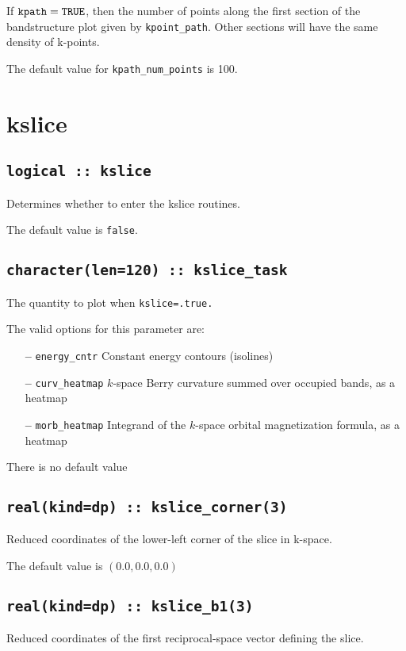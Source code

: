 If $\verb#kpath#=\verb#TRUE#$, then the number of points along
the first section of the bandstructure plot given by
\verb#kpoint_path#. Other sections will have the same density of
k-points. 

The default value for \verb#kpath_num_points# is 100.




\clearpage
\section{kslice}

\subsection[berry]{\tt logical :: kslice}
Determines whether to enter the kslice routines.

The default value is \verb#false#.

\subsection[kslice\_task]{\tt character(len=120) ::  kslice\_task}
The quantity to plot when {\tt kslice=.true.} 

The valid options for this parameter are:
\begin{itemize}
\item[{\bf --}]  \verb#energy_cntr# Constant energy contours (isolines)
\item[{\bf --}] \verb#curv_heatmap# $k$-space Berry curvature summed over
  occupied bands, as a heatmap
\item[{\bf --}] \verb#morb_heatmap# Integrand of the $k$-space orbital
  magnetization formula, as a heatmap
\end{itemize}
There is no default value

\subsection[kslice\_corner]{\tt real(kind=dp) :: kslice\_corner(3)}
Reduced coordinates of the lower-left corner of the slice in k-space.

The default value is $(0.0,0.0,0.0)$

\subsection[kslice\_corner]{\tt real(kind=dp) :: kslice\_b1(3)}
Reduced coordinates of the first reciprocal-space vector 
defining the slice.


